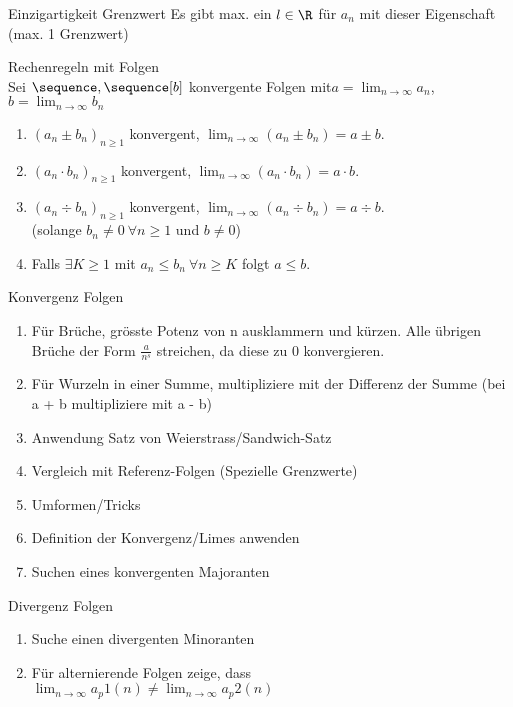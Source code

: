 \begin{lemma}{Einzigartigkeit Grenzwert}
    Es gibt max. ein $l \in \R$ für $a_n$ mit dieser Eigenschaft (max. 1 Grenzwert)
\end{lemma}

\begin{theorem}{Rechenregeln mit Folgen}\\
    Sei $\sequence,\sequence[b]$ konvergente Folgen mit$a = \lim_{n \to \infty} a_n$, $b = \lim_{n \to \infty} b_n$
    \begin{enumerate}
        \item $(a_n \pm b_n)_{n \geq 1}$ konvergent, $\lim_{n \to \infty} (a_n \pm b_n) = a \pm b$.
        \item $(a_n \cdot b_n)_{n \geq 1}$ konvergent, $\lim_{n \to \infty} (a_n \cdot b_n) = a \cdot b$.
        \item $(a_n \div  b_n)_{n \geq 1}$ konvergent, $\lim_{n \to \infty} (a_n \div b_n) = a \div b$.
        \\(solange $b_n \neq 0 ~ \forall n \geq 1$ und $b \neq 0$)
        \item Falls $\exists K \geq 1$ mit $a_n \leq b_n ~ \forall n \geq K$ folgt $a \leq b$.
    \end{enumerate}
\end{theorem}

\begin{KR}{Konvergenz Folgen}
    \begin{enumerate}
        \item Für Brüche, grösste Potenz von n ausklammern und kürzen. Alle übrigen Brüche der Form $\frac{a}{n^s}$ streichen, da diese zu 0 konvergieren.
        \item Für Wurzeln in einer Summe, multipliziere mit der Differenz der Summe (bei a + b multipliziere mit a - b)
        \item Anwendung Satz von Weierstrass/Sandwich-Satz 
        \item Vergleich mit Referenz-Folgen (Spezielle Grenzwerte)
        \item Umformen/Tricks
        \item Definition der Konvergenz/Limes anwenden
        \item Suchen eines konvergenten Majoranten
    \end{enumerate}
\end{KR}

\begin{KR}{Divergenz Folgen}
    \begin{enumerate}
        \item  Suche einen divergenten Minoranten
        \item Für alternierende Folgen zeige, dass \\$\lim_{n \to \infty} a_p1(n) \neq \lim_{n \to \infty} a_p2(n)$
    \end{enumerate}
\end{KR}

